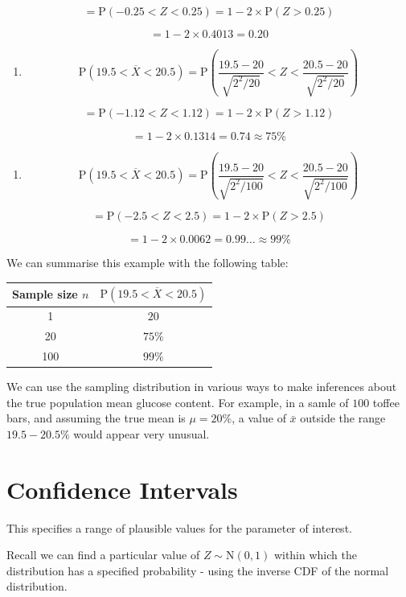 \documentclass[
]{book}
\providecommand{\tightlist}{%
  \setlength{\itemsep}{0pt}\setlength{\parskip}{0pt}}
\theoremstyle{definition}
\theoremstyle{definition}
\theoremstyle{definition}
\theoremstyle{definition}
\theoremstyle{remark}
\begin{document}
\[= \text{P}(-0.25<Z<0.25)=1-2\times\text{P}(Z>0.25)\]

\[=1-2\times 0.4013=0.20\]

\begin{enumerate}
\def\labelenumi{\alph{enumi})}
\setcounter{enumi}{1}
\tightlist
\item
  \[\text{P}(19.5<\overline{X}<20.5)= \text{P}\left(\frac{19.5-20}{\sqrt{2^2 / 20}}<Z<\frac{20.5-20}{\sqrt{2^2 / 20}}\right)\]
\end{enumerate}

\[= \text{P}(-1.12<Z<1.12)=1-2\times\text{P}(Z>1.12)\]

\[=1-2\times 0.1314=0.74 \approx 75\%\]

\begin{enumerate}
\def\labelenumi{\alph{enumi})}
\setcounter{enumi}{2}
\tightlist
\item
  \[\text{P}(19.5<\overline{X}<20.5)= \text{P}\left(\frac{19.5-20}{\sqrt{2^2 / 100}}<Z<\frac{20.5-20}{\sqrt{2^2 / 100}}\right)\]
\end{enumerate}

\[= \text{P}(-2.5<Z<2.5)=1-2\times\text{P}(Z>2.5)\]

\[=1-2\times 0.0062=0.99\ldots \approx 99\%\]

We can summarise this example with the following table:

\begin{longtable}[]{@{}cc@{}}
\toprule
Sample size \(n\) & \(\text{P}(19.5 <\overline{X} < 20.5)\)\tabularnewline
\midrule
\endhead
1 & \(20\)\tabularnewline
20 & \(75\%\)\tabularnewline
100 & \(99\%\)\tabularnewline
\bottomrule
\end{longtable}

We can use the sampling distribution in various ways to make inferences about the true population mean glucose content. For example, in a samle of \(100\) toffee bars, and assuming the true mean is \(\mu=20\%\), a value of \(\bar{x}\) outside the range \(19.5 - 20.5\%\) would appear very unusual.

\hypertarget{confidence-intervals}{%
\section{Confidence Intervals}\label{confidence-intervals}}

This specifies a range of plausible values for the parameter of interest.

Recall we can find a particular value of \(Z\sim \text{N}(0,1)\) within which the distribution has a specified probability - using the inverse CDF of the normal distribution.
\end{document}
